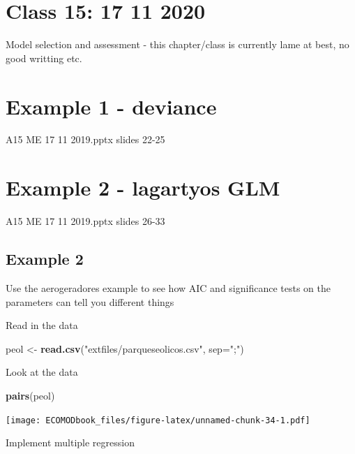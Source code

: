 \documentclass[
]{book}
\newenvironment{Shaded}{\begin{snugshade}}{\end{snugshade}}
\newcommand{\AttributeTok}[1]{\textcolor[rgb]{0.13,0.29,0.53}{#1}}
\newcommand{\FunctionTok}[1]{\textcolor[rgb]{0.13,0.29,0.53}{\textbf{#1}}}
\newcommand{\NormalTok}[1]{#1}
\newcommand{\OtherTok}[1]{\textcolor[rgb]{0.56,0.35,0.01}{#1}}
\newcommand{\StringTok}[1]{\textcolor[rgb]{0.31,0.60,0.02}{#1}}
\begin{document}
\hypertarget{aula15}{%
\chapter{Class 15: 17 11 2020}\label{aula15}}

Model selection and assessment - this chapter/class
is currently lame at best, no good writting etc.

\hypertarget{example-1---deviance}{%
\chapter{Example 1 - deviance}\label{example-1---deviance}}

A15 ME 17 11 2019.pptx
slides 22-25

\hypertarget{example-2---lagartyos-glm}{%
\chapter{Example 2 - lagartyos GLM}\label{example-2---lagartyos-glm}}

A15 ME 17 11 2019.pptx
slides 26-33

\hypertarget{example-2}{%
\section{Example 2}\label{example-2}}

Use the aerogeradores example to see how AIC and significance tests on the parameters can tell you different things

Read in the data

\begin{Shaded}
\begin{Highlighting}[]
\NormalTok{peol }\OtherTok{\textless{}{-}} \FunctionTok{read.csv}\NormalTok{(}\StringTok{"extfiles/parqueseolicos.csv"}\NormalTok{, }\AttributeTok{sep=}\StringTok{";"}\NormalTok{)}
\end{Highlighting}
\end{Shaded}

Look at the data

\begin{Shaded}
\begin{Highlighting}[]
\FunctionTok{pairs}\NormalTok{(peol)}
\end{Highlighting}
\end{Shaded}

\texttt{[image: ECOMODbook\_files/figure-latex/unnamed-chunk-34-1.pdf]}

Implement multiple regression
\end{document}

